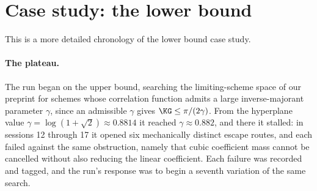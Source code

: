 \newpage
\appendix


\section{Case study: the lower bound}
\label{app:ai-case-study}


This is a more detailed chronology of the lower bound case study.


\paragraph{The plateau.}
The run began on the upper bound, searching the limiting-scheme space of our
preprint for schemes whose correlation function admits a large
inverse-majorant parameter $\gamma$, since an admissible $\gamma$ gives
$\KG\le\pi/(2\gamma)$. From the hyperplane value
$\gamma=\log(1+\sqrt2)\approx0.8814$ it reached $\gamma\approx0.882$, and
there it stalled: in sessions 12 through 17 it opened six 
mechanically distinct escape routes, and each failed against the same obstruction,
namely that cubic coefficient mass cannot be cancelled without also reducing
the linear coefficient. Each failure was recorded and tagged, and the run's
response was to begin a seventh variation of the same search.

